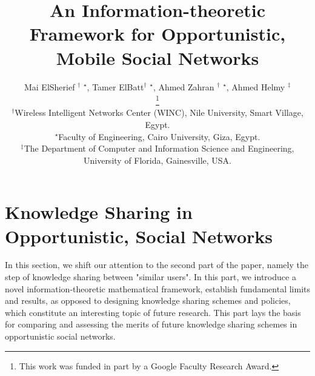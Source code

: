 \documentclass[11pt]{article}
\date{}
\begin{document}
\title{{\fontsize{20}{20}\selectfont An Information-theoretic Framework for Opportunistic, Mobile Social Networks}}


\author{\large Mai ElSherief $^\dagger$ $^\star$, Tamer ElBatt$^\dagger$ $^\star$,  Ahmed Zahran $^\dagger$ $^\star$, Ahmed Helmy $^\ddagger$  \\ [.1in]
\thanks{This work was funded in part by a Google Faculty Research Award.}
\small  \begin{tabular}{c} $^\dagger$Wireless Intelligent Networks Center (WINC), Nile University, Smart Village, Egypt.\\
$^\star$Faculty of Engineering, Cairo University, Giza, Egypt.\\
$^\ddagger$The Department of Computer and Information Science and Engineering,
University of Florida, Gainesville, USA. \\
\end{tabular} }

\maketitle

\begin{abstract}
\end{abstract}

\section{Knowledge Sharing in Opportunistic, Social Networks}
\indent
In this section, we shift our attention to the second part of the paper, namely the step 
of knowledge sharing between "similar users". In this part, we introduce a novel information-theoretic mathematical framework, establish fundamental limits and results, as opposed to designing knowledge sharing schemes and policies, which constitute an interesting topic of future research. This part lays the basis for comparing and assessing the merits of future knowledge sharing schemes in opportunistic social networks.
\end{document}
